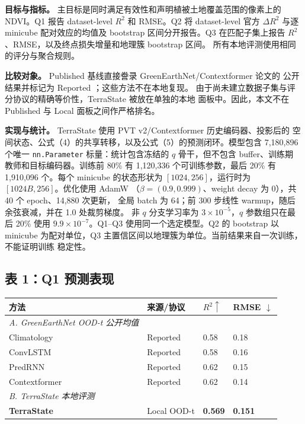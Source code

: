 \documentclass[11pt,a4paper,fontset=fandol]{ctexart}
\begin{document}
\textbf{目标与指标。} 主目标是同时满足有效性和声明植被土地覆盖范围的像素上的 NDVI。Q1 报告 dataset-level $R^2$ 和 RMSE。Q2 将 dataset-level 官方 $\Delta R^2$ 与逐 minicube 配对效应的均值及 bootstrap 区间分开报告。Q3 在匹配子集上报告 $R^2$、RMSE，以及终点损失增量和地理簇 bootstrap 区间。 所有本地评测使用相同的评分与聚合规则。

\textbf{比较对象。} Published 基线直接誊录 GreenEarthNet/Contextformer 论文的 公开结果并标记为 Reported \cite{benson2024multimodal}；这些方法不在本地复现。 由于尚未建立数据子集与评分协议的精确等价性，TerraState 被放在单独的本地 面板中。因此，本文不在 Published 与 Local 面板之间作严格排名。

\textbf{实现与统计。} TerraState 使用 PVT v2/\allowbreak Contextformer 历史编码器、投影后的 空间状态、公式（4）的共享转移，以及公式（5）的预测闭环。模型包含 7,180,896 个唯一 \texttt{nn.Parameter} 标量：统计包含冻结的 $q$ 骨干，但不包含 buffer、训练期 教师和目标编码器。训练前 80\% 有 1,120,336 个可训练参数，最后 20\% 有 1,910,096 个。每个 minicube 的状态形状为 $[1024,256]$，运行时为 $[1024B,256]$。优化使用 AdamW （$\beta=(0.9,0.999)$、weight decay 为 0），共 40 个 epoch、14,880 次更新， 全局 batch 为 64；前 300 步线性 warmup，随后余弦衰减，并在 1.0 处裁剪梯度。 非 $q$ 分支学习率为 $3\times10^{-5}$，$q$ 参数组只在最后 20\% 使用 $9.9\times10^{-7}$。Q1–Q3 使用同一个选定模型。Q2 的 bootstrap 以 minicube 为配对单位，Q3 主置信区间以地理簇为单位。当前结果来自一次训练，不能证明训练 稳定性。

\subsection*{表 1：Q1 预测表现}

\begin{center}
\small
\begin{tabularx}{\textwidth}{@{}Y Y Y Y@{}}
\toprule
\textbf{方法} & \textbf{来源/协议} & \textbf{$R^2\uparrow$} & \textbf{RMSE $\downarrow$} \\
\midrule
\emph{A. GreenEarthNet OOD-t 公开均值} &  &  &  \\
Climatology & Reported & 0.58 & 0.18 \\
ConvLSTM & Reported & 0.58 & 0.16 \\
PredRNN & Reported & 0.62 & 0.15 \\
Contextformer & Reported & 0.62 & 0.14 \\
\emph{B. TerraState 本地评测} &  &  &  \\
\textbf{TerraState} & Local OOD-t & \textbf{0.569} & \textbf{0.151} \\
\bottomrule
\end{tabularx}
\end{center}
\end{document}
